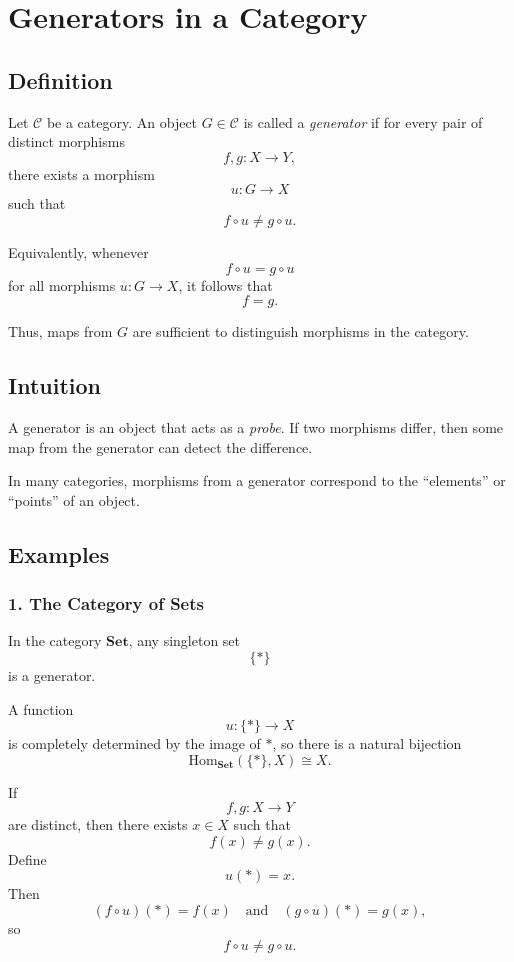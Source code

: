 \section{Generators in a Category}

\subsection{Definition}

Let $\mathcal{C}$ be a category. An object $G \in \mathcal{C}$ is called a
\emph{generator} if for every pair of distinct morphisms
\[
f,g : X \to Y,
\]
there exists a morphism
\[
u : G \to X
\]
such that
\[
f \circ u \neq g \circ u.
\]

Equivalently, whenever
\[
f \circ u = g \circ u
\]
for all morphisms $u : G \to X$, it follows that
\[
f=g.
\]

Thus, maps from $G$ are sufficient to distinguish morphisms in the category.

\subsection{Intuition}

A generator is an object that acts as a \emph{probe}. If two morphisms differ,
then some map from the generator can detect the difference.

In many categories, morphisms from a generator correspond to the
``elements'' or ``points'' of an object.

\subsection{Examples}

\subsubsection*{1. The Category of Sets}

In the category $\mathbf{Set}$, any singleton set
\[
\{*\}
\]
is a generator.

A function
\[
u : \{*\} \to X
\]
is completely determined by the image of $*$, so there is a natural bijection
\[
\mathrm{Hom}_{\mathbf{Set}}(\{*\},X)
\cong X.
\]

If
\[
f,g : X \to Y
\]
are distinct, then there exists $x\in X$ such that
\[
f(x)\neq g(x).
\]
Define
\[
u(*)=x.
\]
Then
\[
(f\circ u)(*)=f(x)
\quad\text{and}\quad
(g\circ u)(*)=g(x),
\]
so
\[
f\circ u \neq g\circ u.
\]

